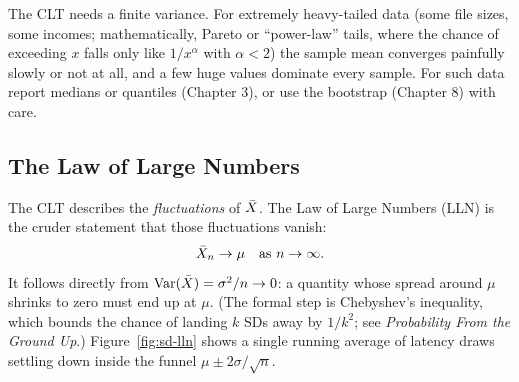 \begin{trapbox}
The CLT needs a finite variance. For extremely heavy-tailed data (some file
sizes, some incomes; mathematically, Pareto or ``power-law'' tails, where the
chance of exceeding $x$ falls only like $1/x^{\alpha}$ with $\alpha<2$) the
sample mean converges
painfully slowly or not at all, and a few huge values dominate every sample. For
such data report medians or quantiles (Chapter 3), or use the bootstrap
(Chapter 8) with care.
\end{trapbox}

\subsection{The Law of Large Numbers}

The CLT describes the \emph{fluctuations} of $\bar{X}$. The Law of Large Numbers
(LLN) is the cruder statement that those fluctuations vanish:
\[
\bar{X}_n\to\mu\quad\text{as } n\to\infty .
\]
It follows directly from $\operatorname{Var}(\bar{X})=\sigma^2/n\to 0$: a quantity whose spread
around $\mu$ shrinks to zero must end up at $\mu$. (The formal step is Chebyshev's
inequality, which bounds the chance of landing $k$ SDs away by $1/k^2$; see
\emph{Probability From the Ground Up}.) Figure~\ref{fig:sd-lln} shows a single
running average of latency draws settling down inside the funnel
$\mu\pm 2\sigma/\sqrt n$.


